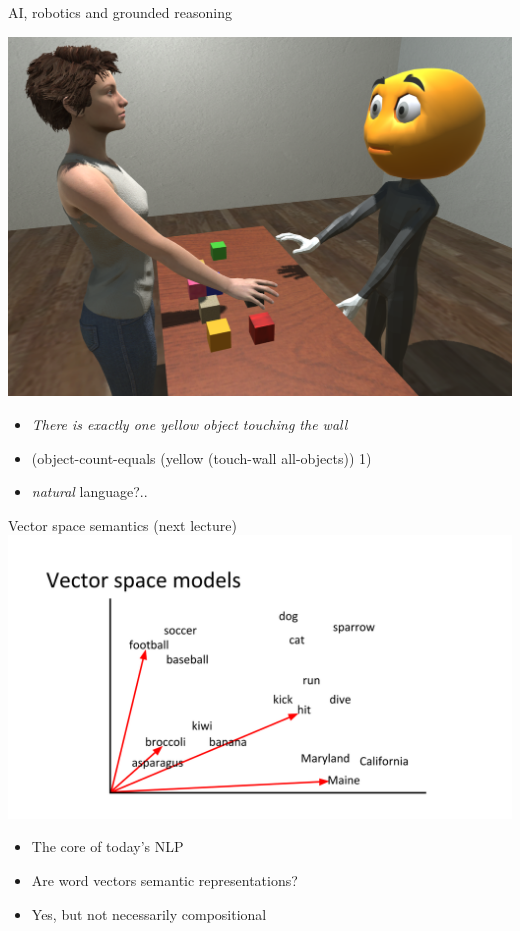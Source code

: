 \documentclass{beamer}
\begin{document}
\begin{frame}{AI, robotics and grounded reasoning}

  \includegraphics[height=0.7\textheight]{figures/krishnaswamy}

  \begin{itemize}
  \item {\it There is exactly one yellow object touching the wall}
  \item (object-count-equals (yellow (touch-wall all-objects)) 1)
  \item {\it natural} language?..
  \end{itemize}
\end{frame}

\begin{frame}{Vector space semantics (next lecture)}
  \includegraphics[height=0.6\textheight]{figures/vector-space}
  \begin{itemize}
  \item The core of today's NLP
  \item Are word vectors semantic representations?
  \item Yes, but not necessarily compositional
  \end{itemize}
\end{frame}
\end{document}
